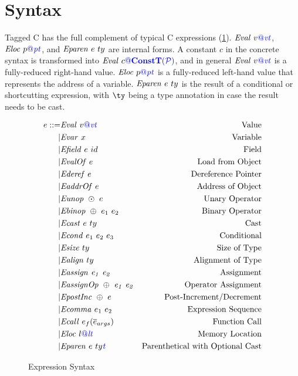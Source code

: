 \documentclass{llncs}
\begin{document}
\begin{table}[t]
\section{Syntax}

Tagged C has the full complement of typical C expressions (\cref{fig:expr}). \(\mathit{Eval} ~ v{\color{blue} @}\mathit{\color{blue} vt}\),
\(\mathit{Eloc} ~ p{\color{blue} @}\mathit{\color{blue} pt}\), and \(\mathit{Eparen} ~ e ~ ty\) are internal forms.
A constant \(c\) in the concrete syntax is transformed into \(\mathit{Eval} ~ c{\color{blue} @}\color{blue} \mathbf{ConstT}(\mathcal{\color{blue} P\mathit{}})\),
and in general \(\mathit{Eval} ~ v{\color{blue} @}\mathit{\color{blue} vt}\) is a fully-reduced right-hand value. \(\mathit{Eloc} ~ p{\color{blue} @}\mathit{\color{blue} pt}\)
is a fully-reduced left-hand value that represents the address of a variable.
\(\mathit{Eparen} ~ e ~ ty\) is the result of a conditional or shortcutting
expression, with \(\ty\) being a type annotation in case the result needs to
be cast.

\begin{figure}
  \[\begin{aligned}
  e ::= & \mathit{Eval} ~ v{\color{blue} @}\mathit{\color{blue} vt} & \textnormal{Value} \\
  | & \mathit{Evar} ~ x & \textnormal{Variable} \\
  | & \mathit{Efield} ~ e ~ id & \textnormal{Field} \\
  | & \mathit{EvalOf} ~ e & \textnormal{Load from Object} \\
  | & \mathit{Ederef} ~ e & \textnormal{Dereference Pointer} \\
  | & \mathit{EaddrOf} ~ e & \textnormal{Address of Object} \\
  | & \mathit{Eunop} ~ \odot ~ e & \textnormal{Unary Operator} \\
  | & \mathit{Ebinop} ~ \oplus ~ e_1 ~ e_2 & \textnormal{Binary Operator} \\
  | & \mathit{Ecast} ~ e ~ ty & \textnormal{Cast} \\
  | & \mathit{Econd} ~ e_1 ~ e_2 ~ e_3 & \textnormal{Conditional} \\
  | & \mathit{Esize} ~ ty & \textnormal{Size of Type} \\
  | & \mathit{Ealign} ~ ty & \textnormal{Alignment of Type} \\
  | & \mathit{Eassign ~ e_1 ~ e_2} & \textnormal{Assignment} \\
  | & \mathit{EassignOp ~ \oplus ~ e_1 ~ e_2} & \textnormal{Operator Assignment} \\
  | & \mathit{EpostInc} ~ \oplus ~ e & \textnormal{Post-Increment/Decrement} \\
  | & \mathit{Ecomma} ~ e_1 ~ e_2 & \textnormal{Expression Sequence} \\
  | & \mathit{Ecall} ~ e_f(\overline{e}_{args}) & \textnormal{Function Call} \\
  | & \mathit{Eloc} ~ l{\color{blue} @}\mathit{\color{blue} lt} & \textnormal{Memory Location} \\
  | & \mathit{Eparen} ~ e ~ ty{\mathit{\color{blue} t}} & \textnormal{Parenthetical with Optional Cast} \\
  \end{aligned}\]
  \caption{Expression Syntax}
  \label{fig:expr}
\end{figure}


\end{table}
\end{document}
